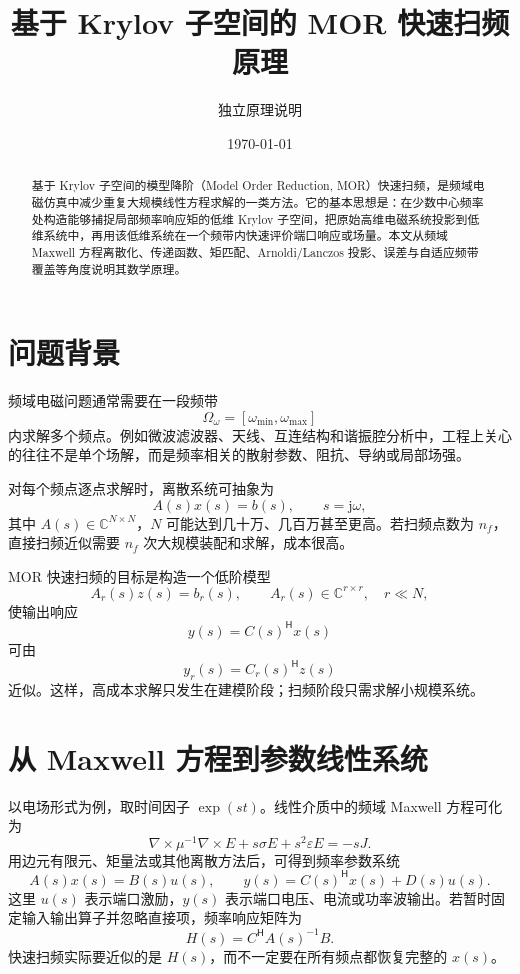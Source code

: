 \documentclass[UTF8,a4paper,11pt]{ctexart}
\title{基于 Krylov 子空间的 MOR 快速扫频原理}
\author{独立原理说明}
\date{\today}
\newcommand{\jj}{\mathrm{j}}
\newcommand{\CC}{\mathbb{C}}
\newcommand{\herm}{\mathsf{H}}
\begin{document}
\maketitle

\begin{abstract}
基于 Krylov 子空间的模型降阶（Model Order Reduction, MOR）快速扫频，是频域电磁仿真中减少重复大规模线性方程求解的一类方法。它的基本思想是：在少数中心频率处构造能够捕捉局部频率响应矩的低维 Krylov 子空间，把原始高维电磁系统投影到低维系统中，再用该低维系统在一个频带内快速评价端口响应或场量。本文从频域 Maxwell 方程离散化、传递函数、矩匹配、Arnoldi/Lanczos 投影、误差与自适应频带覆盖等角度说明其数学原理。
\end{abstract}

\tableofcontents

\section{问题背景}

频域电磁问题通常需要在一段频带
\[
    \Omega_\omega=[\omega_{\min},\omega_{\max}]
\]
内求解多个频点。例如微波滤波器、天线、互连结构和谐振腔分析中，工程上关心的往往不是单个场解，而是频率相关的散射参数、阻抗、导纳或局部场强。

对每个频点逐点求解时，离散系统可抽象为
\begin{equation}
    A(s)x(s)=b(s),\qquad s=\jj\omega,
    \label{eq:full-system}
\end{equation}
其中 $A(s)\in\CC^{N\times N}$，$N$ 可能达到几十万、几百万甚至更高。若扫频点数为 $n_f$，直接扫频近似需要 $n_f$ 次大规模装配和求解，成本很高。

MOR 快速扫频的目标是构造一个低阶模型
\begin{equation}
    A_r(s)z(s)=b_r(s),\qquad A_r(s)\in\CC^{r\times r},\quad r\ll N,
\end{equation}
使输出响应
\[
    y(s)=C(s)^{\herm}x(s)
\]
可由
\[
    y_r(s)=C_r(s)^{\herm}z(s)
\]
近似。这样，高成本求解只发生在建模阶段；扫频阶段只需求解小规模系统。

\section{从 Maxwell 方程到参数线性系统}

以电场形式为例，取时间因子 $\exp(st)$。线性介质中的频域 Maxwell 方程可化为
\begin{equation}
    \nabla\times\mu^{-1}\nabla\times E
    +s\sigma E+s^2\varepsilon E
    =-sJ .
    \label{eq:curlcurl}
\end{equation}
用边元有限元、矩量法或其他离散方法后，可得到频率参数系统
\begin{equation}
    A(s)x(s)=B(s)u(s),\qquad
    y(s)=C(s)^{\herm}x(s)+D(s)u(s).
    \label{eq:mimo-system}
\end{equation}
这里 $u(s)$ 表示端口激励，$y(s)$ 表示端口电压、电流或功率波输出。若暂时固定输入输出算子并忽略直接项，频率响应矩阵为
\begin{equation}
    H(s)=C^{\herm}A(s)^{-1}B .
    \label{eq:transfer}
\end{equation}
快速扫频实际要近似的是 $H(s)$，而不一定要在所有频点都恢复完整的 $x(s)$。
\end{document}
